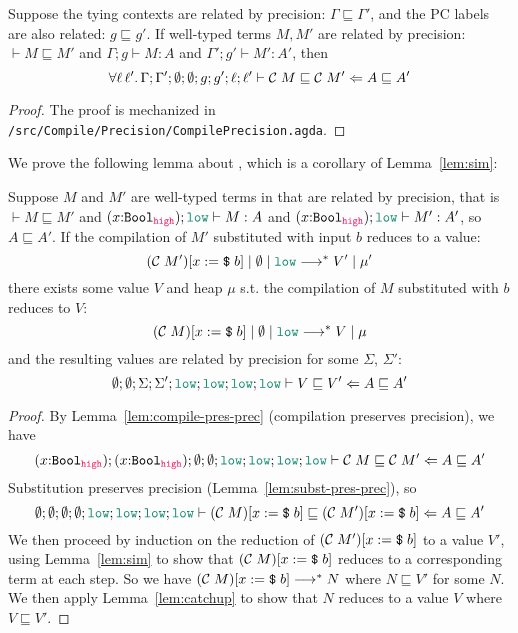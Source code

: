 \begin{lemma}
  \label{lem:compile-pres-prec}
  Suppose the tying contexts are related by precision: $\Gamma \sqsubseteq
  \Gamma'$, and the PC labels are also related: $g \sqsubseteq g'$. If
  well-typed \Surface terms $M, M'$ are related by precision: $\vdash M
  \sqsubseteq M'$ and $\Gamma ; g \vdash M : A$ and $\Gamma'; g' \vdash M' :
  A'$, then
  $$\forall \ell\, \ell'.\, {\Gamma};{\Gamma'};{\emptyset};{\emptyset};{g};{g'};{\ell};{\ell'}\vdash{\ensuremath{\mathcal{C}\;{M}}}\sqsubseteq{\ensuremath{\mathcal{C}\;{M'}}}\Leftarrow{A}\sqsubseteq{A'}$$
\end{lemma}
\begin{proof}
  The proof is mechanized in \texttt{/src/Compile/Precision/CompilePrecision.agda}.
\end{proof}


We prove the following lemma about \Surface, which is a corollary of
Lemma~\ref{lem:sim}:

\begin{lemma}
\label{lem:gg}
Suppose $M$ and $M'$ are well-typed terms in \Surface that are related by
precision, that is $\vdash M \sqsubseteq M'$ and $(x{:}\Bool_{\high}); \low \vdash
M : A$ and $(x{:}\Bool_{\high}); \low \vdash M' : A'$, so $A \sqsubseteq A'$.
%
If the compilation of $M'$ substituted with input $b$ reduces to a value:
$$(\compile{M'})[x:=\ccconst{b}]\mid\emptyset\mid\low \longrightarrow^{*} V'\mid\mu'$$
there exists some value $V$ and heap $\mu$ s.t. the compilation of $M$
substituted with $b$ reduces to $V$:
$$(\compile{M})[x:=\ccconst{b}]\mid\emptyset\mid\low \longrightarrow^{*} V\mid\mu$$
and the resulting values are related by precision for some $\Sigma$, $\Sigma'$:
$$\precctx{\emptyset}{\emptyset}{\Sigma}{\Sigma'}{\low}{\low}{\low}{\low}\ccprec{V}{V'}{A}{A'}$$
\end{lemma}
\begin{proof}
  By Lemma~\ref{lem:compile-pres-prec} (compilation preserves precision), we have
  $$\precctx{(x{:}\Bool_{\high})}{(x{:}\Bool_{\high})}{\emptyset}{\emptyset}{\low}{\low}{\low}{\low}\ccprec{\compile{M}}{\compile{M'}}{A}{A'}$$
  Substitution preserves precision (Lemma~\ref{lem:subst-pres-prec}), so
  $$\precctx{\emptyset}{\emptyset}{\emptyset}{\emptyset}{\low}{\low}{\low}{\low}\ccprec{(\compile{M})[x:=\ccconst{b}]}{(\compile{M'})[x:=\ccconst{b}]}{A}{A'}$$
  We then proceed by induction on the reduction of $(\mathcal{C}\;{M'})[x:=\text{\texttt{{\$}}}\;{b}]$ to a value
  $V'$, using Lemma~\ref{lem:sim} to show that $(\mathcal{C}\;{M})[x:=\text{\texttt{{\$}}}\;{b}]$ reduces to a
  corresponding term at each step. So we have $(\mathcal{C}\;{M})[x:=\text{\texttt{{\$}}}\;{b}] \longrightarrow^{*}
  N$ where $N \sqsubseteq V'$ for some $N$. We then apply
  Lemma~\ref{lem:catchup} to show that $N$ reduces to a value $V$ where $V
  \sqsubseteq V'$.
\end{proof}

